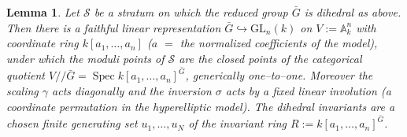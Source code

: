 \documentclass{amsart}
\newtheorem{lemma}[theorem]{Lemma}
\theoremstyle{definition}
\DeclareMathOperator{\Spec}{Spec}
\begin{document}
\begin{lemma}\label{lem:linear}
Let $\mathcal S$ be a stratum on which the reduced group $\bar G$ is dihedral as
above. Then there is a faithful linear representation
$\bar G\hookrightarrow \mathrm{GL}_n(k)$ on $V:=\mathbb{A}^n_k$ with coordinate
ring $k[a_1,\dots,a_n]$ ($a$ $=$ the normalized coefficients of the model), under
which the moduli points of $\mathcal S$ are the closed points of the categorical
quotient $V/\!\!/\bar G=\Spec k[a_1,\dots,a_n]^{\bar G}$, generically
one--to--one. Moreover the scaling $\gamma$ acts \emph{diagonally} and the
inversion $\sigma$ acts by a fixed \emph{linear involution} (a coordinate
permutation in the hyperelliptic model). The dihedral invariants are a chosen
finite generating set $u_1,\dots,u_N$ of the invariant ring
$R:=k[a_1,\dots,a_n]^{\bar G}$.
\end{lemma}
\end{document}
